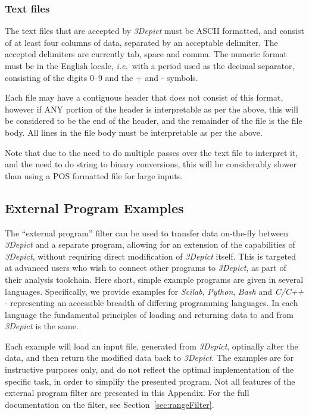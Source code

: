 \documentclass[10pt]{article}
\begin{document}
\subsubsection{Text files}
\label{sec:textformat}
The text files that are accepted by \emph{3Depict} must be ASCII formatted, and consist of at least four columns of data, separated by an acceptable delimiter. The accepted delimiters are currently tab, space and comma. The numeric format must be in the English locale, \emph{i.e.}\ with a period used as the decimal separator, consisting of the digits 0--9 and the + and - symbols.

Each file may have a contiguous header that does not consist of this format, however if ANY portion of the header is interpretable as per the above, this will be considered to be the end of the header, and the remainder of the file is the file body. All lines in the file body must be interpretable as per the above.  

Note that due to the need to do multiple passes over the text file to interpret it, and the need to do string to binary conversions, this will be considerably slower than using a POS formatted file for large inputs.



\subsection{External Program Examples}
\label{sec:externalProgExample}
The ``external program'' filter can be used to transfer data on-the-fly between \emph{3Depict} and a separate program, allowing for an extension of the capabilities of \emph{3Depict}, without requiring direct modification of \emph{3Depict} itself. This is targeted at advanced users who wish to connect other programs to \emph{3Depict}, as part of their analysis toolchain. Here short, simple example programs are given in several languages. Specifically, we provide examples for  \emph{Scilab}, \emph{Python}, \emph{Bash} and \emph{C/C++} - representing an accessible breadth of differing programming languages. In each language the fundamental principles of loading and returning data to and from \emph{3Depict} is the same.

Each example will load an input file, generated from \emph{3Depict}, optinally alter the data, and then return the modified data back to \emph{3Depict}. The examples are for instructive purposes only, and do not reflect the optimal implementation of the specific task, in order to simplify the presented program. Not all features of the external program filter are presented in this Appendix. For the full documentation on the filter, see Section~\ref{sec:rangeFilter}.
\end{document}
